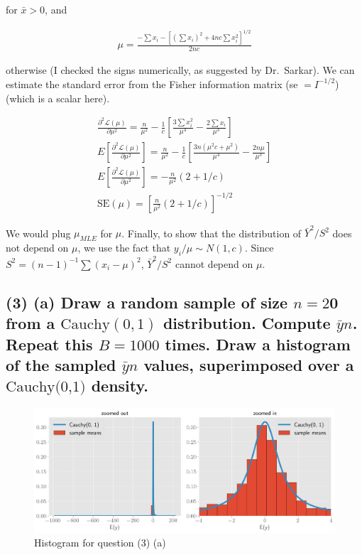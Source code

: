 \documentclass[11pt]{article}
\begin{document}
 for $\bar{x} > 0$, and 
 
 \begin{align*}
     \mu = \frac{-\sum x_i - [(\sum x_i)^2 + 4nc \sum x_i^2]^{1/2}}{2nc}
 \end{align*}
 
 otherwise (I checked the signs numerically, as suggested by Dr.\ Sarkar). We can estimate the standard error from the Fisher information matrix (se $= I^{-1/2}$) (which is a scalar here).
 
 \begin{align*}
     \frac{\partial ^2 \mathcal{L}(\mu)}{\partial \mu^2} = \frac{n}{\mu^2}-\frac{1}{c}\left[\frac{3\sum x_i^2}{\mu^4}-\frac{2\sum x_i}{\mu^3}\right] \\
     E\left[\frac{\partial ^2 \mathcal{L}(\mu)}{\partial \mu^2}\right] = \frac{n}{\mu^2}-\frac{1}{c}\left[\frac{3 n(\mu^2c+\mu^2)}{\mu^4}-\frac{2n\mu}{\mu^3}\right] \\
      E\left[\frac{\partial ^2 \mathcal{L}(\mu)}{\partial \mu^2}\right] =  -\frac{n}{\mu^2} (2+1/c)\\
      \text{SE}(\mu) =  [\frac{n}{\mu^2} (2+1/c)]^{-1/2}
 \end{align*}
 
We would plug $\mu_{MLE}$ for $\mu$. Finally, to show that the distribution of $\bar{Y}^2/S^2$ does not depend on $\mu$, we use the fact that $y_i/\mu \sim N(1, c)$. Since $S^2 =  (n-1)^{-1} \sum(x_i-\mu)^2$,  $\bar{Y}^2/S^2$  cannot depend on $\mu$.
 

 
 
\subsection*{(3)  (a) Draw a random sample of size $n = 2$0 from a $\text{Cauchy}(0,1)$ distribution. Compute $\bar{y}n$. Repeat this $B = 1000$ times. Draw a histogram of the sampled $\bar{y}n$ values, superimposed over a $\text{Cauchy(0,1)}$ density.}

\begin{figure}[!h]
    \centering
    \includegraphics[scale=.55]{homework_2/figures/cauchy_mean.png}
    \caption{Histogram for question (3) (a)}
    \label{fig:my_label}
\end{figure}
\end{document}
